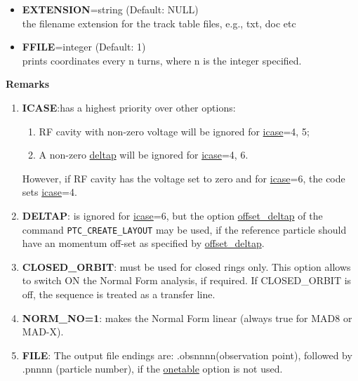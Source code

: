 \begin{itemize}
   \item {\bf EXTENSION}=string (Default: NULL)\\
     the filename extension for the track table files, e.g., txt, doc etc 

   \item {\bf FFILE}=integer (Default: 1)\\
     prints coordinates every n turns, where n is the integer specified.
\end{itemize}


{\bf Remarks}\\
\begin{enumerate}
   \item {\bf ICASE}:has a highest priority over other options: 
     \begin{enumerate}
        \item RF cavity with non-zero voltage will be ignored for
          \hyperlink{ICASE}{icase}=4, 5;
        \item A non-zero \hyperlink{DELTAP}{deltap} will be ignored 
          for \hyperlink{ICASE}{icase}=4, 6.
     \end{enumerate}
     However, if RF cavity has the voltage set to zero and 
     for \hyperlink{ICASE}{icase}=6, the code sets
     \hyperlink{ICASE}{icase}=4.

   \item {\bf DELTAP}: is ignored for \hyperlink{ICASE}{icase}=6, but
     the option \href{../ptc_general/ptc_general.html}{offset\_deltap}
     of the command \texttt{PTC\_CREATE\_LAYOUT} may be used, if the
     reference particle should have an momentum off-set as specified by
     \href{../ptc_general/ptc_general.html}{offset\_deltap}. 
 
   \item {\bf CLOSED\_ORBIT}: must be used for closed rings only. This
     option allows to switch ON the Normal Form analysis, if
     required. If CLOSED\_ORBIT is off, the sequence is treated as a
     transfer line. 

   \item {\bf NORM\_NO=1}: makes the Normal Form linear (always true for
     MAD8 or MAD-X). 

   \item {\bf FILE}: The output file endings are: .obsnnnn(observation
     point), followed by .pnnnn (particle number), if the
     \hyperlink{ONETABLE}{onetable} option is not used.  
\end{enumerate}


